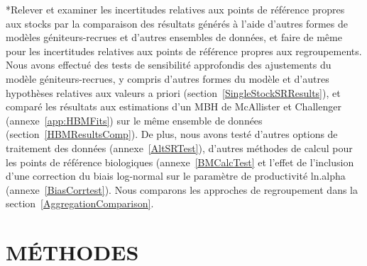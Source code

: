 \documentclass[french,11pt]{book}
\begin{document}
\begin{enumerate}
  *Relever et examiner les incertitudes relatives aux points de référence propres aux stocks par la comparaison des résultats générés à l'aide d'autres formes de modèles géniteurs-recrues et d'autres ensembles de données, et faire de même pour les incertitudes relatives aux points de référence propres aux regroupements. Nous avons effectué des tests de sensibilité approfondis des ajustements du modèle géniteurs-recrues, y compris d'autres formes du modèle et d'autres hypothèses relatives aux valeurs a priori (section~\ref{SingleStockSRResults}), et comparé les résultats aux estimations d'un MBH de McAllister et Challenger (annexe~\ref{app:HBMFits}) sur le même ensemble de données (section~\ref{HBMResultsComp}). De plus, nous avons testé d'autres options de traitement des données (annexe~\ref{AltSRTest}), d'autres méthodes de calcul pour les points de référence biologiques (annexe~\ref{BMCalcTest} et l'effet de l'inclusion d'une correction du biais log-normal sur le paramètre de productivité ln.alpha (annexe~\ref{BiasCorrtest}). Nous comparons les approches de regroupement dans la section~\ref{AggregationComparison}.
\end{enumerate}
\clearpage

\section{MÉTHODES}\label{muxe9thodes}
\end{document}
